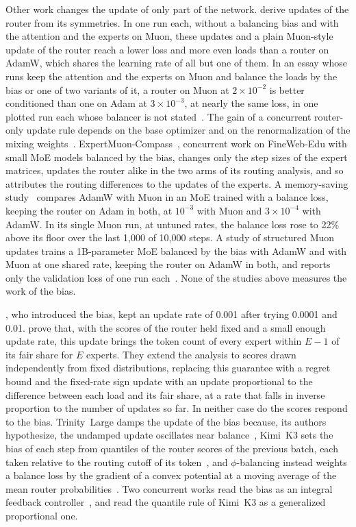 \documentclass[11pt, a4paper]{article}
\begin{document}
Other work changes the update of only part of the network. \citet{lau2026symmetry} derive updates of the router from its symmetries. In one run each, without a balancing bias and with the attention and the experts on Muon, these updates and a plain Muon-style update of the router reach a lower loss and more even loads than a router on AdamW, which shares the learning rate of all but one of them. In an essay whose runs keep the attention and the experts on Muon and balance the loads by the bias or one of two variants of it, a router on Muon at $2 \times 10^{-2}$ is better conditioned than one on Adam at $3 \times 10^{-3}$, at nearly the same loss, in one plotted run each whose balancer is not stated~\citep{srivastava2026lossfree}. The gain of a concurrent router-only update rule depends on the base optimizer and on the renormalization of the mixing weights~\citep{anon2026sqrt}. ExpertMuon-Compass~\citep{vaidya2026compass}, concurrent work on FineWeb-Edu with small MoE models balanced by the bias, changes only the step sizes of the expert matrices, updates the router alike in the two arms of its routing analysis, and so attributes the routing differences to the updates of the experts. A memory-saving study~\citep{malik2026skewadam} compares AdamW with Muon in an MoE trained with a balance loss, keeping the router on Adam in both, at $10^{-3}$ with Muon and $3 \times 10^{-4}$ with AdamW\@. In its single Muon run, at untuned rates, the balance loss rose to 22\% above its floor over the last 1,000 of 10,000 steps. A study of structured Muon updates trains a 1B-parameter MoE balanced by the bias with AdamW and with Muon at one shared rate, keeping the router on AdamW in both, and reports only the validation loss of one run each~\citep{miasnikov2026monarch}. None of the studies above measures the work of the bias.

\citet{wang2024lossfree}, who introduced the bias, kept an update rate of 0.001 after trying 0.0001 and 0.01. \citet{han2025lossfree} prove that, with the scores of the router held fixed and a small enough update rate, this update brings the token count of every expert within $E - 1$ of its fair share for $E$ experts. They extend the analysis to scores drawn independently from fixed distributions, replacing this guarantee with a regret bound and the fixed-rate sign update with an update proportional to the difference between each load and its fair share, at a rate that falls in inverse proportion to the number of updates so far. In neither case do the scores respond to the bias. Trinity~Large damps the update of the bias because, its authors hypothesize, the undamped update oscillates near balance~\citep{singh2026trinity}, Kimi~K3 sets the bias of each step from quantiles of the router scores of the previous batch, each taken relative to the routing cutoff of its token~\citep{kimi2026k3}, and $\phi$-balancing instead weights a balance loss by the gradient of a convex potential at a moving average of the mean router probabilities~\citep{chen2026phibalancing}. Two concurrent works read the bias as an integral feedback controller~\citep{jin2026idbalancing, anon2026feedback}, and \citet{jin2026idbalancing} read the quantile rule of Kimi~K3 as a generalized proportional one.
\end{document}
